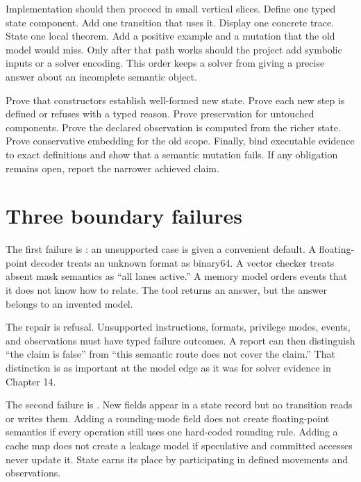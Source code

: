 Implementation should then proceed in small vertical slices. Define one typed
state component. Add one transition that uses it. Display one concrete trace.
State one local theorem. Add a positive example and a mutation that the old
model would miss. Only after that path works should the project add symbolic
inputs or a solver encoding. This order keeps a solver from giving a precise
answer about an incomplete semantic object.

\begin{proofkit}[title={Six obligations for accepting an extension}]
Prove that constructors establish well-formed new state. Prove each new step
is defined or refuses with a typed reason. Prove preservation for untouched
components. Prove the declared observation is computed from the richer state.
Prove conservative embedding for the old scope. Finally, bind executable
evidence to exact definitions and show that a semantic mutation fails. If any
obligation remains open, report the narrower achieved claim.
\end{proofkit}

\section{Three boundary failures}

The first failure is : an unsupported case is given
a convenient default. A floating-point decoder treats an unknown format as
binary64. A vector checker treats absent mask semantics as ``all lanes active.''
A memory model orders events that it does not know how to relate. The tool
returns an answer, but the answer belongs to an invented model.

The repair is refusal. Unsupported instructions, formats, privilege modes,
events, and observations must have typed failure outcomes. A report can then
distinguish ``the claim is false'' from ``this semantic route does not cover
the claim.'' That distinction is as important at the model edge as it was for
solver evidence in Chapter 14.

The second failure is . New fields appear in a state
record but no transition reads or writes them. Adding a rounding-mode field
does not create floating-point semantics if every operation still uses one
hard-coded rounding rule. Adding a cache map does not create a leakage model if
speculative and committed accesses never update it. State earns its place by
participating in defined movements and observations.

